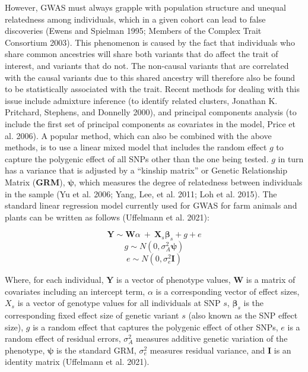 \documentclass[
]{book}
\begin{document}
However, GWAS must always grapple with population structure and unequal relatedness among individuals, which in a given cohort can lead to false discoveries (Ewens and Spielman 1995; Members of the Complex Trait Consortium 2003). This phenomenon is caused by the fact that individuals who share common ancestries will share both variants that do affect the trait of interest, and variants that do not. The non-causal variants that are correlated with the causal variants due to this shared ancestry will therefore also be found to be statistically associated with the trait. Recent methods for dealing with this issue include admixture inference (to identify related clusters, Jonathan K. Pritchard, Stephens, and Donnelly 2000), and principal components analysis (to include the first set of principal components as covariates in the model, Price et al. 2006). A popular method, which can also be combined with the above methods, is to use a linear mixed model that includes the random effect \(g\) to capture the polygenic effect of all SNPs other than the one being tested. \(g\) in turn has a variance that is adjusted by a ``kinship matrix'' or Genetic Relationship Matrix (\textbf{GRM}), \(\pmb{\psi}\), which measures the degree of relatedness between individuals in the sample (Yu et al. 2006; Yang, Lee, et al. 2011; Loh et al. 2015). The standard linear regression model currently used for GWAS for farm animals and plants can be written as follows (Uffelmann et al. 2021):

\begin{equation}
\textbf{Y} \sim \textbf{W} \alpha ~+~\textbf{X}_s\pmb{\beta}_s + g + e \label{eq:gwaslmm}
\end{equation}
\begin{equation}
g \sim N(0,\sigma^2_A\pmb{\psi}) \label{eq:gwaslmmg}
\end{equation}
\begin{equation}
e \sim N(0,\sigma^2_e \textbf{I}) \label{eq:gwaslmme}
\end{equation}

Where, for each individual, \(\textbf{Y}\) is a vector of phenotype values, \(\textbf{W}\) is a matrix of covariates including an intercept term, \(\alpha\) is a corresponding vector of effect sizes, \(X_s\) is a vector of genotype values for all individuals at SNP \(s\), \(\pmb{\beta}_s\) is the corresponding fixed effect size of genetic variant \(s\) (also known as the SNP effect size), \(g\) is a random effect that captures the polygenic effect of other SNPs, \(e\) is a random effect of residual errors, \(\sigma^2_{A}\) measures additive genetic variation of the phenotype, \(\pmb{\psi}\) is the standard GRM, \(\sigma^2_e\) measures residual variance, and \(\textbf{I}\) is an identity matrix (Uffelmann et al. 2021).
\end{document}
